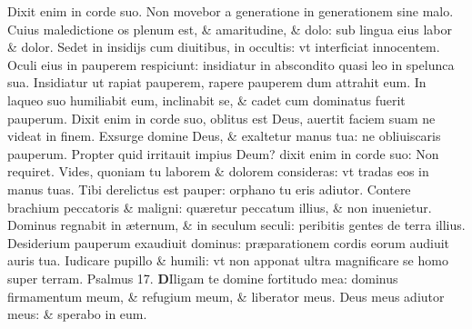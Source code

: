 \documentclass[a5paper,10pt]{book}
\def\ae{æ}
\begin{document}
\begin{multicols*}{2}
\newline \color{red} D\color{black}ixit enim in corde suo. Non movebor a generatione in generationem sine malo.
\newline \color{red} C\color{black}uius maledictione os plenum est, \& amaritudine, \& dolo: sub lingua eius labor \& dolor.
\newline \color{red} S\color{black}edet in insidijs cum diuitibus, in occultis: vt interficiat innocentem.
\newline \color{red} O\color{black}culi eius in pauperem respiciunt: insidiatur in abscondito quasi leo in spelunca sua.
\newline \color{red} I\color{black}nsidiatur ut rapiat pauperem, rapere pauperem dum attrahit eum.
\newline \color{red} I\color{black}n laqueo suo humiliabit eum, inclinabit se, \& cadet cum dominatus fuerit pauperum.
\newline \color{red} D\color{black}ixit enim in corde suo, oblitus est Deus, auertit faciem suam ne videat in finem.
\newline \color{red} E\color{black}xsurge domine Deus, \& exaltetur manus tua: ne obliuiscaris pauperum.
\newline \color{red} P\color{black}ropter quid irritauit impius Deum? dixit enim in corde suo: Non requiret.
\newline \color{red} V\color{black}ides, quoniam tu laborem \& dolorem consideras: vt tradas eos in manus tuas.
\newline \color{red} T\color{black}ibi derelictus est pauper: orphano tu eris adiutor.
\newline \color{red} C\color{black}ontere brachium peccatoris \& maligni: qu\ae retur peccatum illius, \& non inuenietur.
\newline \color{red} D\color{black}ominus regnabit in \ae ternum, \& in seculum seculi: peribitis gentes de terra illius.
\newline \color{red} D\color{black}esiderium pauperum exaudiuit dominus: pr\ae parationem cordis eorum audiuit auris tua.
\newline \color{red} I\color{black}udicare pupillo \& humili: vt non apponat ultra magnificare se homo super terram. \quad \color{red} Psalmus 17. \color{black}
\vspace{-1em}
\lettrine[lines=2]{\bfseries \color{red} D}{}Iligam te domine fortitudo mea: dominus firmamentum meum, \& refugium meum, \& liberator meus.
\newline \color{red} D\color{black}eus meus adiutor meus: \& sperabo in eum.

\end{multicols*}
\end{document}
